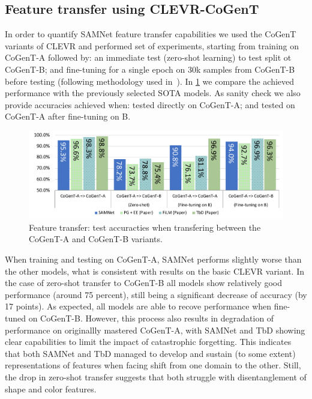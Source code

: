 \subsection{Feature transfer using CLEVR-CoGenT}
\label{sec:feature}

In order to quantify SAMNet feature transfer capabilities we used the CoGenT variants of CLEVR and performed set of experiments, starting from training on CoGenT-A followed by:
an immediate test (zero-shot learning) to test split ot CoGenT-B; and fine-tuning for a single epoch on 30k samples from CoGenT-B before testing (following methodology used in~\cite{johnson2017inferring, mascharka2018transparency, perez2018film, marois2018transfer}).
In \cref{fig:CoGenT-B-results} we compare the achieved performance with the previously selected SOTA models. 
As sanity check we also provide accuracies achieved when: tested directly on CoGenT-A; and tested on CoGenT-A after fine-tuning on B.

\begin{figure}[htbp]
	\centering
	\includegraphics[width=\columnwidth]{../img/plots/cogent_feature_transfer_baselines.pdf}
	\caption{Feature transfer: test accuracties when transfering between the CoGenT-A and CoGenT-B variants.}
	\label{fig:CoGenT-B-results}
\end{figure}

When training and testing on CoGenT-A, SAMNet performs slightly worse than the other models, what is consistent with results on the basic CLEVR variant.
In the case of zero-shot transfer to CoGenT-B all models show relatively good performance (around 75 percent), still being a significant decrease of accuracy (by 17 points).
As expected, all models are able to recove performance when fine-tuned on CoGenT-B.
However, this process also results in degradation of performance on originallly mastered CoGenT-A, with SAMNet and TbD showing clear capabilities to limit the impact of catastrophic forgetting.
This indicates that both SAMNet and TbD managed to develop and sustain (to some extent) representations of features when facing shift from one domain to the other.
Still, the drop in zero-shot transfer suggests that both struggle with disentanglement of shape and color features.

